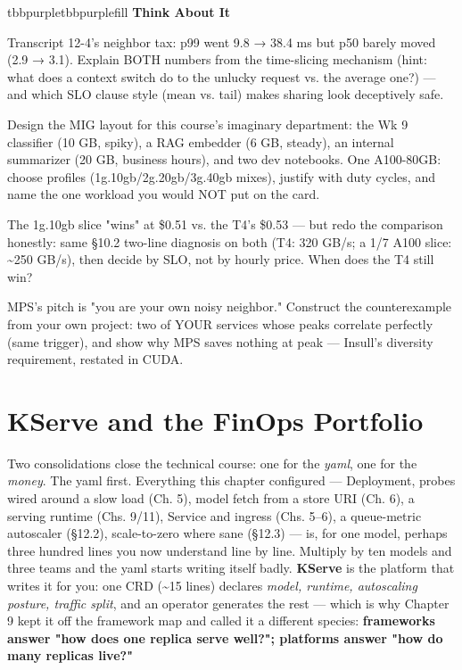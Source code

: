 \begin{calloutbox}{tbbpurple}{tbbpurplefill}
{\normalsize\bfseries\color{tbbpurple}Think About It}\par\vspace{3pt}
\begin{tbbitemize}
  \item Transcript 12-4's neighbor tax: p99 went 9.8 → 38.4 ms but p50 barely moved (2.9 → 3.1). Explain BOTH numbers from the time-slicing mechanism (hint: what does a context switch do to the unlucky request vs. the average one?) — and which SLO clause style (mean vs. tail) makes sharing look deceptively safe.
  \item Design the MIG layout for this course's imaginary department: the Wk 9 classifier (10 GB, spiky), a RAG embedder (6 GB, steady), an internal summarizer (20 GB, business hours), and two dev notebooks. One A100-80GB: choose profiles (1g.10gb/2g.20gb/3g.40gb mixes), justify with duty cycles, and name the one workload you would NOT put on the card.
  \item The 1g.10gb slice "wins" at \$0.51 vs. the T4's \$0.53 — but redo the comparison honestly: same §10.2 two-line diagnosis on both (T4: 320 GB/s; a 1/7 A100 slice: \textasciitilde{}250 GB/s), then decide by SLO, not by hourly price. When does the T4 still win?
  \item MPS's pitch is "you are your own noisy neighbor." Construct the counterexample from your own project: two of YOUR services whose peaks correlate perfectly (same trigger), and show why MPS saves nothing at peak — Insull's diversity requirement, restated in CUDA.
\end{tbbitemize}
\end{calloutbox}

\section{KServe and the FinOps Portfolio}

Two consolidations close the technical course: one for the \textit{yaml}, one for the \textit{money}. The yaml first. Everything this chapter configured — Deployment, probes wired around a slow load (Ch. 5), model fetch from a store URI (Ch. 6), a serving runtime (Chs. 9/11), Service and ingress (Chs. 5–6), a queue-metric autoscaler (§12.2), scale-to-zero where sane (§12.3) — is, for one model, perhaps three hundred lines you now understand line by line. Multiply by ten models and three teams and the yaml starts writing itself badly. \textbf{KServe} is the platform that writes it for you: one  CRD (\textasciitilde{}15 lines) declares \textit{model, runtime, autoscaling posture, traffic split}, and an operator generates the rest — which is why Chapter 9 kept it off the framework map and called it a different species: \textbf{frameworks answer "how does one replica serve well?"; platforms answer "how do many replicas live?"}


